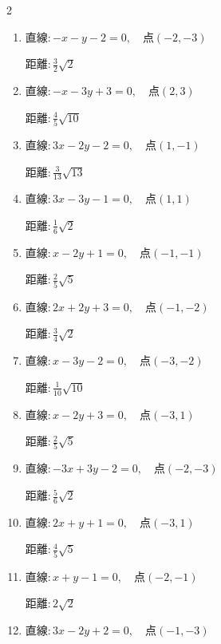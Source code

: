 \begin{multicols}{2}
\begin{enumerate}
  \item $直線:-x-y-2=0,\quad 点 ( -2, -3 )$

        $\displaystyle 距離 : \frac{3}{2}\sqrt{2}$

  \item $直線:-x-3y+3=0,\quad 点 ( 2, 3 )$

        $\displaystyle 距離 : \frac{4}{5}\sqrt{10}$

  \item $直線:3x-2y-2=0,\quad 点 ( 1, -1 )$

        $\displaystyle 距離 : \frac{3}{13}\sqrt{13}$

  \item $直線:3x-3y-1=0,\quad 点 ( 1, 1 )$

        $\displaystyle 距離 : \frac{1}{6}\sqrt{2}$

  \item $直線:x-2y+1=0,\quad 点 ( -1, -1 )$

        $\displaystyle 距離 : \frac{2}{5}\sqrt{5}$

  \item $直線:2x+2y+3=0,\quad 点 ( -1, -2 )$

        $\displaystyle 距離 : \frac{3}{4}\sqrt{2}$

  \item $直線:x-3y-2=0,\quad 点 ( -3, -2 )$

        $\displaystyle 距離 : \frac{1}{10}\sqrt{10}$

  \item $直線:x-2y+3=0,\quad 点 ( -3, 1 )$

        $\displaystyle 距離 : \frac{2}{5}\sqrt{5}$

  \item $直線:-3x+3y-2=0,\quad 点 ( -2, -3 )$

        $\displaystyle 距離 : \frac{5}{6}\sqrt{2}$

\columnbreak %

\resetques

  \item $直線:2x+y+1=0,\quad 点 ( -3, 1 )$

        $\displaystyle 距離 : \frac{4}{5}\sqrt{5}$

  \item $直線:x+y-1=0,\quad 点 ( -2, -1 )$

        $\displaystyle 距離 : 2\sqrt{2}$

  \item $直線:3x-2y+2=0,\quad 点 ( -1, -3 )$


\end{enumerate}
\end{multicols}
